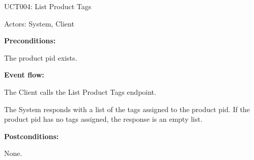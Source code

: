 \begin{ucbox}{UCT004: List Product Tags}
\label{UCT004}

Actors: System, Client

\textbf{Preconditions:}

\ucitem The product pid exists.

\textbf{Event flow:}

\ucitem The Client calls the List Product Tags endpoint.

\ucitem The System responds with a list of the tags assigned to the product pid. If the product pid has no tags assigned, the response is an empty list.

\textbf{Postconditions:}

\ucitem None.

\end{ucbox}
\newpage